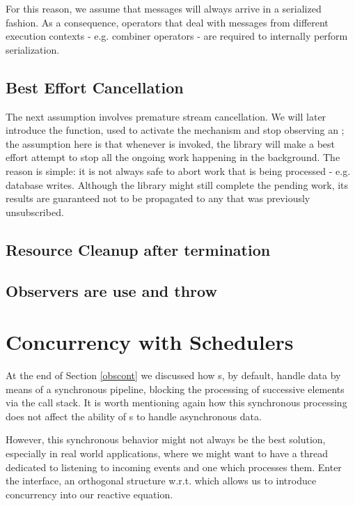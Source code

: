 For this reason, we assume that messages will always arrive in a serialized fashion. As a consequence, operators that deal with messages from different execution contexts - e.g. combiner operators - are required to internally perform serialization.

\subsection{Best Effort Cancellation}
\label{ass-besteffort}
The next assumption involves premature stream cancellation. We will later introduce the  function, used to activate the mechanism and stop observing an ; the assumption here is that whenever  is invoked, the library will make a best effort attempt to stop all the ongoing work happening in the background. The reason is simple: it is not always safe to abort work that is being processed - e.g. database writes. Although the library might still complete the pending work, its results are guaranteed not to be propagated to any  that was previously unsubscribed.

\subsection{Resource Cleanup after termination}
\subsection{Observers are use and throw}

\section{Concurrency with Schedulers}

At the end of Section \ref{obscont} we discussed how s, by default, handle data by means of a synchronous pipeline, blocking the processing of successive elements via the call stack. It is worth mentioning again how this synchronous processing does not affect the ability of s to handle asynchronous data.

However, this synchronous behavior might not always be the best solution, especially in real world applications, where we might want to have a thread dedicated to listening to incoming events and one which processes them. Enter the  interface, an orthogonal\cite{wiki:orthogonality} structure w.r.t.  which allows us to introduce concurrency into our reactive equation. 

